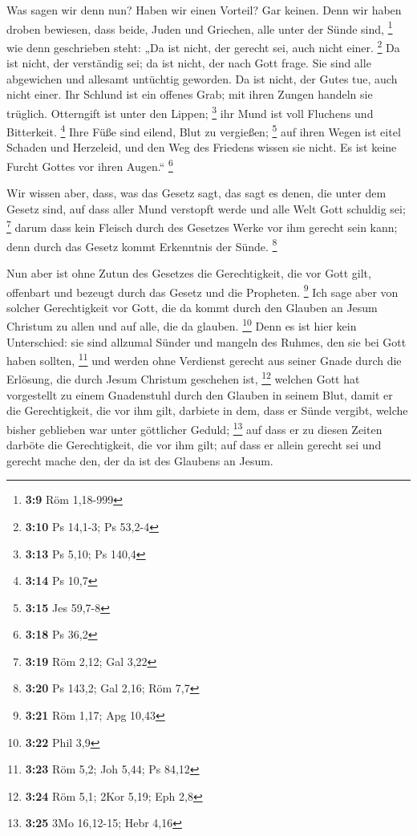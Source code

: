  Was sagen wir denn nun? Haben wir einen Vorteil? Gar
keinen. Denn wir haben droben bewiesen, dass beide, Juden und Griechen,
alle unter der Sünde sind, \footnote{\textbf{3:9} Röm 1,18-999}
 wie denn geschrieben steht: „Da ist nicht, der gerecht
sei, auch nicht einer. \footnote{\textbf{3:10} Ps 14,1-3; Ps 53,2-4}
 Da ist nicht, der verständig sei; da ist nicht, der nach
Gott frage.  Sie sind alle abgewichen und allesamt
untüchtig geworden. Da ist nicht, der Gutes tue, auch nicht einer.
 Ihr Schlund ist ein offenes Grab; mit ihren Zungen handeln
sie trüglich. Otterngift ist unter den Lippen; \footnote{\textbf{3:13}
  Ps 5,10; Ps 140,4}  ihr Mund ist voll Fluchens und
Bitterkeit. \footnote{\textbf{3:14} Ps 10,7}  Ihre Füße
sind eilend, Blut zu vergießen; \footnote{\textbf{3:15} Jes 59,7-8}
 auf ihren Wegen ist eitel Schaden und Herzeleid,
 und den Weg des Friedens wissen sie nicht. 
Es ist keine Furcht Gottes vor ihren Augen.`` \footnote{\textbf{3:18} Ps
  36,2}

 Wir wissen aber, dass, was das Gesetz sagt, das sagt es
denen, die unter dem Gesetz sind, auf dass aller Mund verstopft werde
und alle Welt Gott schuldig sei; \footnote{\textbf{3:19} Röm 2,12; Gal
  3,22}  darum dass kein Fleisch durch des Gesetzes Werke
vor ihm gerecht sein kann; denn durch das Gesetz kommt Erkenntnis der
Sünde. \footnote{\textbf{3:20} Ps 143,2; Gal 2,16; Röm 7,7}

 Nun aber ist ohne Zutun des Gesetzes die Gerechtigkeit,
die vor Gott gilt, offenbart und bezeugt durch das Gesetz und die
Propheten. \footnote{\textbf{3:21} Röm 1,17; Apg 10,43} 
Ich sage aber von solcher Gerechtigkeit vor Gott, die da kommt durch den
Glauben an Jesum Christum zu allen und auf alle, die da glauben.
\footnote{\textbf{3:22} Phil 3,9}  Denn es ist hier kein
Unterschied: sie sind allzumal Sünder und mangeln des Ruhmes, den sie
bei Gott haben sollten, \footnote{\textbf{3:23} Röm 5,2; Joh 5,44; Ps
  84,12}  und werden ohne Verdienst gerecht aus seiner
Gnade durch die Erlösung, die durch Jesum Christum geschehen ist,
\footnote{\textbf{3:24} Röm 5,1; 2Kor 5,19; Eph 2,8} 
welchen Gott hat vorgestellt zu einem Gnadenstuhl durch den Glauben in
seinem Blut, damit er die Gerechtigkeit, die vor ihm gilt, darbiete in
dem, dass er Sünde vergibt, welche bisher geblieben war unter göttlicher
Geduld; \footnote{\textbf{3:25} 3Mo 16,12-15; Hebr 4,16} 
auf dass er zu diesen Zeiten darböte die Gerechtigkeit, die vor ihm
gilt; auf dass er allein gerecht sei und gerecht mache den, der da ist
des Glaubens an Jesum.

